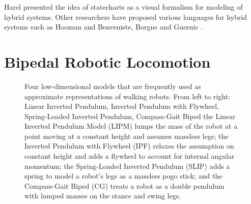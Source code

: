 Harel \cite{Harel1987} presented the idea of statecharts as a visual formalism
for modeling of hybrid systems.
%
Other researchers have proposed various languages for hybrid systems such as
Hooman \cite{Hooman1993} and Benveniste, Borgne and Guernic \cite{Benveniste1993}.




\section{Bipedal Robotic Locomotion}










\begin{figure}
  \centering
  \def\svgwidth{1.0\columnwidth}
  
  \caption[Four low-dimensional models]{Four low-dimensional models that are
    frequently used as approximate representations of walking robots. From left
    to right:
    Linear Inverted Pendulum, Inverted Pendulum with Flywheel, Spring-Loaded
    Inverted Pendulum, Compass-Gait Biped
    the Linear Inverted Pendulum Model (LIPM) lumps the mass of the robot at a
    point moving at a constant height and assumes massless legs;
    the Inverted Pendulum with Flywheel (IPF) relaxes the assumption on constant
    height and adds a flywheel to account for internal angular momentum;
    the Spring-Loaded Inverted Pendulum (SLIP) adds a spring to model a robot's
    legs as a massless pogo stick;
    and the Compass-Gait Biped (CG) treats a robot as a double pendulum with
    lumped masses on the stance and swing legs.}
  \label{fig:biped-models}
\end{figure}


